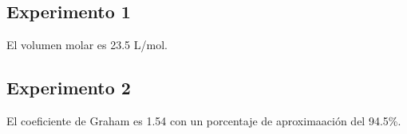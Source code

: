 \documentclass[../main.tex]{subfiles}
\begin{document}
\subsection{Experimento 1}
El volumen molar es 23.5 L/mol.
\subsection{Experimento 2}
El coeficiente de Graham es 1.54 con un porcentaje de aproximaación 
del 94.5\%. 
\end{document}
